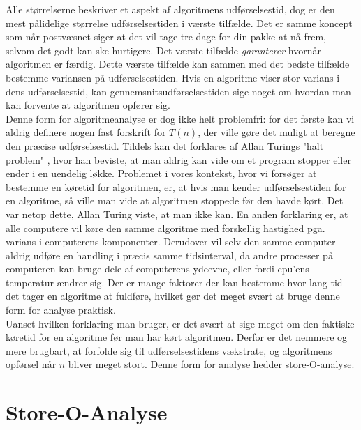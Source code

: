 Alle størrelserne beskriver et aspekt af algoritmens udførselsestid, dog er den mest pålidelige størrelse udførselsestiden i værste tilfælde. Det er samme koncept som når postvæsnet siger at det vil tage tre dage for din pakke at nå frem, selvom det godt kan ske hurtigere. Det værste tilfælde \emph{garanterer} hvornår algoritmen er færdig. Dette værste tilfælde kan sammen med det bedste tilfælde bestemme variansen på udførselsestiden. Hvis en algoritme viser stor varians i dens udførselsestid, kan gennemsnitsudførselsestiden sige noget om hvordan man kan forvente at algoritmen opfører sig.\\

Denne form for algoritmeanalyse er dog ikke helt problemfri: for det første kan vi aldrig definere nogen fast forskrift for $T(n)$, der ville gøre det muligt at beregne den præcise udførselsestid. Tildels kan det forklares af Allan Turings "halt problem" \cite{halting-problem}, hvor han beviste, at man aldrig kan vide om et program stopper eller ender i en uendelig løkke. Problemet i vores kontekst, hvor vi forsøger at bestemme en køretid for algoritmen, er, at hvis man kender udførselsestiden for en algoritme, så ville man vide at algoritmen stoppede før den havde kørt. Det var netop dette, Allan Turing viste, at man ikke kan. En anden forklaring er, at alle computere vil køre den samme algoritme med forskellig hastighed pga. varians i computerens komponenter. Derudover vil selv den samme computer aldrig udføre en handling i præcis samme tidsinterval, da andre processer på computeren kan bruge dele af computerens ydeevne, eller fordi cpu'ens temperatur ændrer sig. Der er mange faktorer der kan bestemme hvor lang tid det tager en algoritme at fuldføre, hvilket gør det meget svært at bruge denne form for analyse praktisk.\\

Uanset hvilken forklaring man bruger, er det svært at sige meget om den faktiske køretid for en algoritme før man har kørt algoritmen. Derfor er det nemmere og mere brugbart, at forfolde sig til udførselsestidens vækstrate, og algoritmens opførsel når $n$ bliver meget stort. Denne form for analyse hedder store-O-analyse.

\section{Store-O-Analyse}
\label{sec:Store-O-Analyse}

